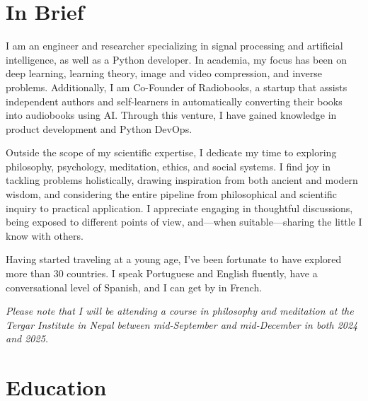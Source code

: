 \documentclass[a4paper,11pt]{article}
\newcommand{\optExtraSpace}{}
\newcommand{\sectionBioNonTech}{
      Outside the scope of my scientific expertise, I dedicate my time to exploring philosophy, psychology, meditation, ethics, and social systems. I find joy in tackling problems holistically, drawing inspiration from both ancient and modern wisdom, and considering the entire pipeline from philosophical and scientific inquiry to practical application. I appreciate engaging in thoughtful discussions, being exposed to different points of view, and—when suitable—sharing the little I know with others.

      Having started traveling at a young age, I've been fortunate to have explored more than 30 countries. I speak Portuguese and English fluently, have a conversational level of Spanish, and I can get by in French.
    }
\newcommand{\optExtraSpace}{\vspace{5pt}}
\newcommand{\sectionBioNonTech}{
      \vspace{10pt}
      Highlights: \\[-20pt]
      \begin{itemize}[topsep=0pt, partopsep=0pt, parsep=0pt, itemsep=0pt, leftmargin=*]
        \item \href{https://www.joaquimcampos.com/pubs.html}{7 publications} with over 300 citations in top-tier venues, and 3 patents.
        \item Contributed to the development of \href{https://www.joaquimcampos.com/compression.html}{pioneering methods} in neural compression.
        \item Crafted \href{https://www.joaquimcampos.com/deepsplines.html}{novel algorithms} for
        learning the activation functions of a neural network.
        \item Created the \href{https://pypi.org/project/deepsplines/}{"Deep Splines"} PyTorch package.
        \item Co-Founded \href{https://radiobooks.webflow.io/}{Radiobooks}—a startup that makes AI text-to-speech technology.
        \item Built the \href{https://github.com/joaquimcampos/radiobooks-sample}{back-end} of a complex text-to-speech app.
      \end{itemize}
    }
\begin{document}

  \vspace{15pt}
  \optExtraSpace

  \section{In Brief}
    I am an engineer and researcher specializing in signal processing and artificial intelligence, as well as a Python developer. In academia, my focus has been on deep learning, learning theory, image and video compression, and inverse problems. Additionally, I am Co-Founder of Radiobooks, a startup that assists independent authors and self-learners in automatically converting their books into audiobooks using AI. Through this venture, I have gained knowledge in product development and Python DevOps.

    \sectionBioNonTech

    \vspace{4pt}

    \emph{Please note that I will be attending a course in philosophy and meditation at the Tergar Institute in Nepal between mid-September and mid-December in both 2024 and 2025.
    }

  \vspace{15pt}
  \optExtraSpace

  \section{Education}
\end{document}
